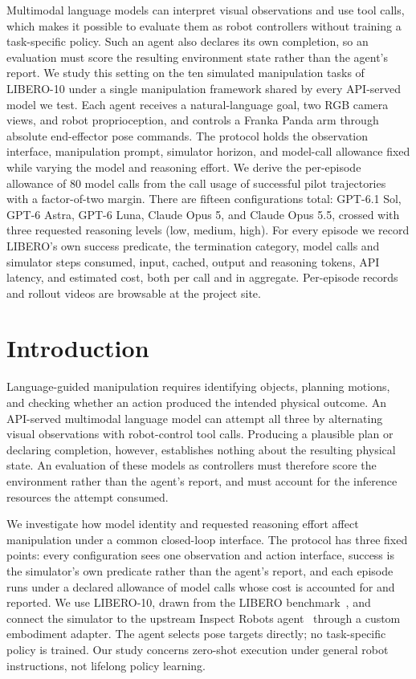 \documentclass[11pt]{article}
\begin{document}
\irvlmaketitle
\begin{irvlabstract}
Multimodal language models can interpret visual observations and use tool calls, which makes it possible to evaluate them as robot controllers without training a task-specific policy. Such an agent also declares its own completion, so an evaluation must score the resulting environment state rather than the agent's report. We study this setting on the ten simulated manipulation tasks of LIBERO-10 under a single manipulation framework shared by every API-served model we test. Each agent receives a natural-language goal, two RGB camera views, and robot proprioception, and controls a Franka Panda arm through absolute end-effector pose commands. The protocol holds the observation interface, manipulation prompt, simulator horizon, and model-call allowance fixed while varying the model and reasoning effort. We derive the per-episode allowance of 80 model calls from the call usage of successful pilot trajectories with a factor-of-two margin. There are fifteen configurations total: GPT-6.1 Sol, GPT-6 Astra, GPT-6 Luna, Claude Opus 5, and Claude Opus 5.5, crossed with three requested reasoning levels (low, medium, high). For every episode we record LIBERO's own success predicate, the termination category, model calls and simulator steps consumed, input, cached, output and reasoning tokens, API latency, and estimated cost, both per call and in aggregate. Per-episode records and rollout videos are browsable at the project site.
\end{irvlabstract}

\section{Introduction}
Language-guided manipulation requires identifying objects, planning motions,
and checking whether an action produced the intended physical outcome. An
API-served multimodal language model can attempt all three by alternating
visual observations with robot-control tool calls. Producing a plausible plan
or declaring completion, however, establishes nothing about the resulting
physical state. An evaluation of these models as controllers must therefore
score the environment rather than the agent's report, and must account for the
inference resources the attempt consumed.

We investigate how model identity and requested reasoning effort affect
manipulation under a common closed-loop interface. The protocol has three
fixed points: every configuration sees one observation and action interface,
success is the simulator's own predicate rather than the agent's report, and
each episode runs under a declared allowance of model calls whose cost is
accounted for and reported. We use LIBERO-10, drawn from the LIBERO
benchmark~\citep{liu2023libero}, and connect the simulator to the upstream
Inspect Robots agent~\citep{inspectrobots} through a custom embodiment
adapter. The agent selects pose targets directly; no task-specific policy is
trained. Our study concerns zero-shot execution under general robot
instructions, not lifelong policy learning.
\end{document}
